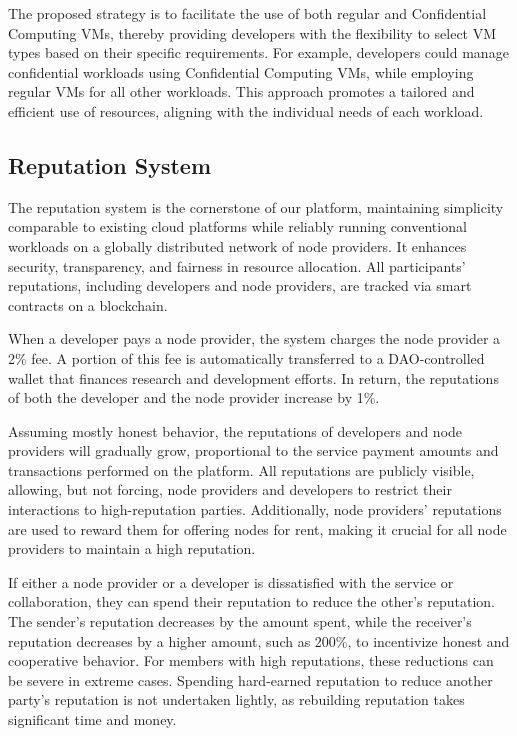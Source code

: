 The proposed strategy is to facilitate the use of both regular and Confidential Computing VMs, thereby providing developers with the flexibility to select VM types based on their specific requirements. For example, developers could manage confidential workloads using Confidential Computing VMs, while employing regular VMs for all other workloads. This approach promotes a tailored and efficient use of resources, aligning with the individual needs of each workload.

\subsection{Reputation System}
\label{sec:reputation_system}

The reputation system is the cornerstone of our platform, maintaining simplicity comparable to existing cloud platforms while reliably running conventional workloads on a globally distributed network of node providers. It enhances security, transparency, and fairness in resource allocation. All participants' reputations, including developers and node providers, are tracked via smart contracts on a blockchain.

When a developer pays a node provider, the system charges the node provider a 2\% fee. A portion of this fee is automatically transferred to a DAO-controlled wallet that finances research and development efforts. In return, the reputations of both the developer and the node provider increase by 1\%.

Assuming mostly honest behavior, the reputations of developers and node providers will gradually grow, proportional to the service payment amounts and transactions performed on the platform. All reputations are publicly visible, allowing, but not forcing, node providers and developers to restrict their interactions to high-reputation parties. Additionally, node providers' reputations are used to reward them for offering nodes for rent, making it crucial for all node providers to maintain a high reputation.

If either a node provider or a developer is dissatisfied with the service or collaboration, they can spend their reputation to reduce the other's reputation. The sender's reputation decreases by the amount spent, while the receiver's reputation decreases by a higher amount, such as 200\%, to incentivize honest and cooperative behavior. For members with high reputations, these reductions can be severe in extreme cases. Spending hard-earned reputation to reduce another party's reputation is not undertaken lightly, as rebuilding reputation takes significant time and money.

